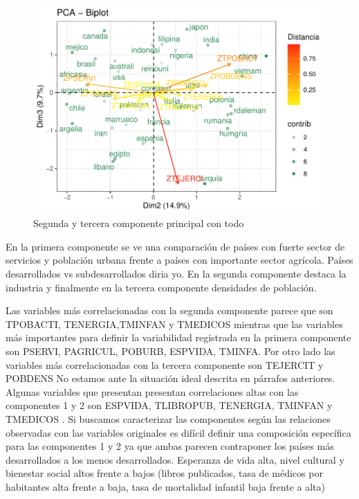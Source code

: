 \documentclass[12pt,twoside]{report}
\begin{document}
\begin{figure}[H]
\includegraphics[width=\textwidth]{../code/figures/segunda_tercera_todo.pdf}
\caption{Segunda y tercera componente principal con todo}
\label{fig:segunda_tercera_todo}
\end{figure} 

En la primera componente se ve una comparación de países con fuerte sector de servicios y población urbana frente a países con importante sector agrícola. Países desarrollados vs subdesarrollados diria yo. En la segunda componente destaca la industria y finalmente en la tercera componente densidades de población.

Las variables más correlacionadas con la segunda componente parece que son TPOBACTI, TENERGIA,TMINFAN y TMEDICOS mientras que las variables más importantes para definir la variabilidad registrada en la primera componente son PSERVI, PAGRICUL, POBURB, ESPVIDA, TMINFA. Por otro lado las variables más correlacionadas con la tercera componente son TEJERCIT y POBDENS No estamos ante la situación ideal descrita en párrafos anteriores. 
Algunas variables que presentan presentan correlaciones altas con las componentes 1 y 2 son ESPVIDA, TLIBROPUB, TENERGIA, TMINFAN y TMEDICOS .
Si buscamos caracterizar las componentes según las relaciones observadas con las variables originales es difícil definir una composición específica para las componentes 1 y 2 ya que ambas parecen contraponer los países más desarrollados a los menos desarrollados. Esperanza de vida alta, nivel cultural y bienestar social altos frente a bajos (libros publicados, tasa de médicos por habitantes alta frente a baja, tasa de mortalidad infantil baja frente a alta)
\end{document}
